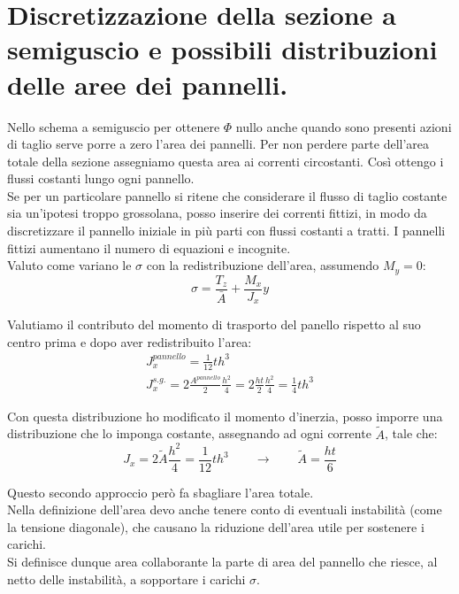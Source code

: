 \section{Discretizzazione della sezione a semiguscio e possibili distribuzioni delle aree dei pannelli.}

Nello schema a semiguscio per ottenere $\Phi$ nullo anche quando sono presenti azioni di taglio serve porre a zero l'area dei pannelli. Per non perdere parte dell'area totale della sezione assegniamo questa area ai correnti circostanti. Così ottengo i flussi costanti lungo ogni pannello.\\
Se per un particolare pannello si ritene che considerare il flusso di taglio costante sia un'ipotesi troppo grossolana, posso inserire dei correnti fittizi, in modo da discretizzare il pannello iniziale in più parti con flussi costanti a tratti. I pannelli fittizi aumentano il numero di equazioni e incognite.\\
Valuto come variano le $    \sigma$ con la redistribuzione dell'area, assumendo $M_y=0$:
\begin{equation*}
    \sigma = \frac{T_z}{\bar{A}}+\frac{M_x}{J_x}y
\end{equation*}

Valutiamo il contributo del momento di trasporto del panello rispetto al suo centro prima e dopo aver redistribuito l'area:
\begin{align*}
    J_x^{pannello} = \frac{1}{12}th^3\\
    J_x^{s.g.} = 2\frac{A^{pannello}}{2} \frac{h^2}{4}=2\frac{ht}{2} \frac{h^2}{4} = \frac{1}{4} th^3
\end{align*}

Con questa distribuzione ho modificato il momento d'inerzia, posso imporre una distribuzione che lo imponga costante, assegnando ad ogni corrente $\tilde{A}$, tale che:
\begin{equation*}
     J_x =2\tilde{A}\frac{h^2}{4} =\frac{1}{12}th^3  \quad \quad \rightarrow\quad \quad \tilde{A} = \frac{ht}{6} 
\end{equation*}

Questo secondo approccio però fa sbagliare l'area totale.\\
Nella definizione dell'area devo anche tenere conto di eventuali instabilità (come la tensione diagonale), che causano la riduzione dell'area utile per sostenere i carichi.\\
Si definisce dunque area collaborante la parte di area del pannello che riesce, al netto delle instabilità, a sopportare i carichi $\sigma$.

